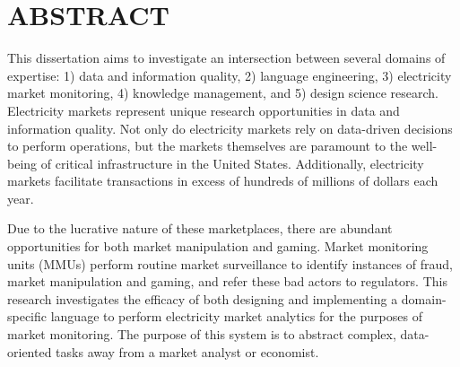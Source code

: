 %
%
%
%  
%

\chapter*{ABSTRACT}

\pagestyle{plain} %
\setcounter{page}{2}

\indent This dissertation aims to investigate an intersection between several domains of expertise: 1) data and information quality, 2) language engineering, 3) electricity market monitoring, 4) knowledge management, and 5) design science research. Electricity markets represent unique research opportunities in data and information quality. Not only do electricity markets rely on data-driven decisions to perform operations, but the markets themselves are paramount to the well-being of critical infrastructure in the United States. Additionally, electricity markets facilitate transactions in excess of hundreds of millions of dollars each year.

Due to the lucrative nature of these marketplaces, there are abundant opportunities for both market manipulation and gaming. Market monitoring units (MMUs) perform routine market surveillance to identify instances of fraud, market manipulation and gaming, and refer these bad actors to regulators. This research investigates the efficacy of both designing and implementing a domain-specific language to perform electricity market analytics for the purposes of market monitoring. The purpose of this system is to abstract complex, data-oriented tasks away from a market analyst or economist.



 

\pagebreak{}
